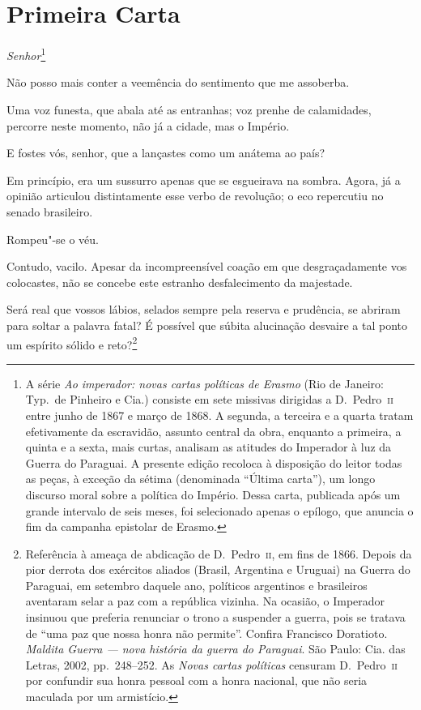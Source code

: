 \chapter{Primeira Carta}

\noindent\textit{Senhor}\footnote{ A série \textit{Ao imperador: novas cartas políticas de Erasmo}  
(Rio de Janeiro: Typ.~de Pinheiro e Cia.) consiste em sete missivas
dirigidas a D.~Pedro~\textsc{ii} entre junho de 1867 e março de 1868. A segunda,
a terceira e a quarta tratam efetivamente da escravidão, assunto
central da obra, enquanto a primeira, a quinta e a sexta, mais curtas,
analisam as atitudes do Imperador à luz da Guerra do Paraguai. A
presente edição recoloca à disposição do leitor todas as peças, à
exceção da sétima (denominada ``Última carta''), um longo discurso moral sobre a política
do Império. Dessa carta, publicada após um grande intervalo de seis
meses, foi selecionado apenas o epílogo, que anuncia o fim da
campanha epistolar de Erasmo.}\smallskip

 Não posso mais conter a veemência do sentimento que me assoberba. 

 Uma voz funesta, que abala até as entranhas; voz prenhe de calamidades,
percorre neste momento, não já a cidade, mas o Império. 

 E fostes vós, senhor, que a lançastes como um anátema ao país? 

 Em princípio, era um sussurro apenas que se esgueirava na sombra.
Agora, já a opinião articulou distintamente esse verbo de revolução; o
eco repercutiu no senado brasileiro. 

 Rompeu"-se o véu. 

 Contudo, vacilo. Apesar da incompreensível coação em que
desgraçadamente vos colocastes, não se concebe este estranho
desfalecimento da majestade. 

 Será real que vossos lábios, selados sempre pela reserva e prudência,
se abriram para soltar a palavra fatal? É possível que súbita
alucinação desvaire a tal ponto um espírito sólido e
reto?\footnote{ Referência à ameaça de abdicação de D.~Pedro~\textsc{ii}, em fins de 1866. Depois da pior
derrota dos exércitos aliados (Brasil, Argentina e Uruguai) na Guerra
do Paraguai, em setembro daquele ano, políticos argentinos e
brasileiros aventaram selar a paz com a república vizinha. Na ocasião,
o Imperador insinuou que preferia renunciar o trono a suspender a
guerra, pois se tratava de ``uma paz que nossa honra não permite''.
Confira Francisco Doratioto. \textit{Maldita Guerra --- nova história da
guerra do Paraguai}. São Paulo: Cia. das Letras, 2002, pp.~248--252.
As \textit{Novas cartas políticas} censuram D.~Pedro~\textsc{ii} por confundir
sua honra pessoal com a honra nacional, que não seria maculada por um armistício.}
 
